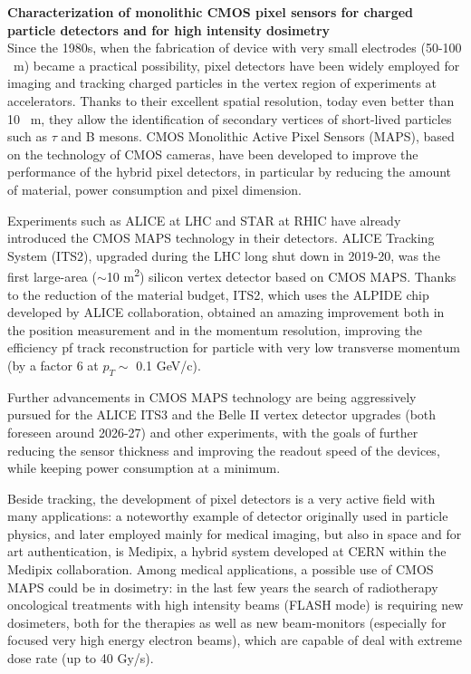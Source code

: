 \documentclass[a4paper]{report}
\begin{document}
\textbf{Characterization of monolithic CMOS pixel sensors for charged particle detectors and for high intensity dosimetry}\\


Since the 1980s, when the fabrication of device with very small electrodes (50-100 \si{\mu m}) became a practical possibility, pixel detectors have been widely employed for imaging and tracking charged particles in the vertex region of experiments at accelerators. Thanks to their excellent spatial resolution, today even better than 10 \si{\mu m}, they allow the identification of secondary vertices of short-lived particles such as $\tau$ and B mesons. 
CMOS Monolithic Active Pixel Sensors (MAPS), based on the technology of CMOS cameras, have been developed to improve the performance of the hybrid pixel detectors, in particular by reducing the amount of material, power consumption and pixel dimension.  

Experiments such as ALICE at LHC and STAR at RHIC have already introduced the CMOS MAPS technology in their detectors. ALICE Tracking System (ITS2), upgraded during the LHC long shut down in 2019-20, was the first large-area ($\sim$10 \si{m^2}) silicon vertex detector based on CMOS MAPS. Thanks to the reduction of the material budget, ITS2, which uses the ALPIDE chip developed by ALICE collaboration, obtained an amazing improvement both in the position measurement and in the momentum resolution, improving the efficiency pf track reconstruction for particle with very low transverse momentum (by a factor 6 at $p_{T}\sim$ 0.1 \si{GeV/c}).

Further advancements in CMOS MAPS technology are being aggressively pursued for the ALICE ITS3 and the Belle II vertex detector upgrades (both foreseen around 2026-27) and other experiments, with the goals of further reducing the sensor thickness and improving the readout speed of the devices, while keeping power consumption at a minimum.

Beside tracking, the development of pixel detectors is a very active field with many applications: a noteworthy example of detector originally used in particle physics, and later employed mainly for medical imaging, but also in space and for art authentication, is Medipix, a hybrid system developed at CERN within the Medipix collaboration.
Among medical applications, a possible use of CMOS MAPS could be in dosimetry: in the last few years the search of radiotherapy oncological treatments with high intensity beams (FLASH mode) is requiring new dosimeters, both for the therapies as well as new beam-monitors (especially for focused very high energy electron beams), which are capable of deal with extreme dose rate (up to 40 \si{Gy/s}).
\end{document}
